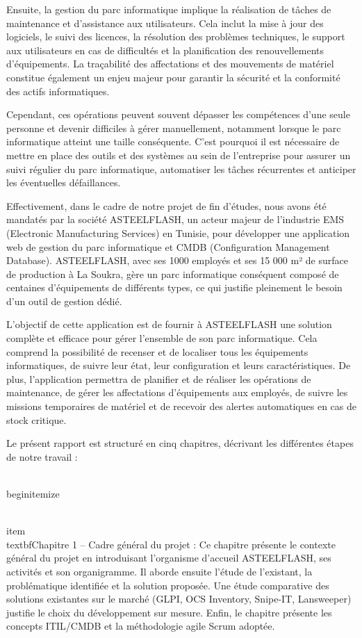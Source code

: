 Ensuite, la gestion du parc informatique implique la réalisation de tâches de maintenance et d'assistance aux utilisateurs. Cela inclut la mise à jour des logiciels, le suivi des licences, la résolution des problèmes techniques, le support aux utilisateurs en cas de difficultés et la planification des renouvellements d'équipements. La traçabilité des affectations et des mouvements de matériel constitue également un enjeu majeur pour garantir la sécurité et la conformité des actifs informatiques.

Cependant, ces opérations peuvent souvent dépasser les compétences d'une seule personne et devenir difficiles à gérer manuellement, notamment lorsque le parc informatique atteint une taille conséquente. C'est pourquoi il est nécessaire de mettre en place des outils et des systèmes au sein de l'entreprise pour assurer un suivi régulier du parc informatique, automatiser les tâches récurrentes et anticiper les éventuelles défaillances.

Effectivement, dans le cadre de notre projet de fin d'études, nous avons été mandatés par la société ASTEELFLASH, un acteur majeur de l'industrie EMS (Electronic Manufacturing Services) en Tunisie, pour développer une application web de gestion du parc informatique et CMDB (Configuration Management Database). ASTEELFLASH, avec ses 1000 employés et ses 15 000 m² de surface de production à La Soukra, gère un parc informatique conséquent composé de centaines d'équipements de différents types, ce qui justifie pleinement le besoin d'un outil de gestion dédié.

L'objectif de cette application est de fournir à ASTEELFLASH une solution complète et efficace pour gérer l'ensemble de son parc informatique. Cela comprend la possibilité de recenser et de localiser tous les équipements informatiques, de suivre leur état, leur configuration et leurs caractéristiques. De plus, l'application permettra de planifier et de réaliser les opérations de maintenance, de gérer les affectations d'équipements aux employés, de suivre les missions temporaires de matériel et de recevoir des alertes automatiques en cas de stock critique.

Le présent rapport est structuré en cinq chapitres, décrivant les différentes étapes de notre travail :

\\begin{itemize}
  
\\item \\textbf{Chapitre 1 -- Cadre général du projet :} Ce chapitre présente le contexte général du projet en introduisant l'organisme d'accueil ASTEELFLASH, ses activités et son organigramme. Il aborde ensuite l'étude de l'existant, la problématique identifiée et la solution proposée. Une étude comparative des solutions existantes sur le marché (GLPI, OCS Inventory, Snipe-IT, Lansweeper) justifie le choix du développement sur mesure. Enfin, le chapitre présente les concepts ITIL/CMDB et la méthodologie agile Scrum adoptée.

